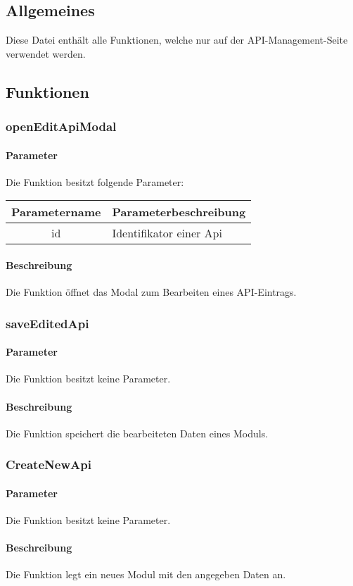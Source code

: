 \subsection{Allgemeines} Diese Datei enthält alle Funktionen, welche nur auf der API-Management-Seite verwendet werden.
\subsection{Funktionen}
\subsubsection{openEditApiModal}
\paragraph{Parameter} Die Funktion besitzt folgende Parameter:
\begin{table}[H]
	\begin{tabular}{|c|p{11cm}|}
		\hline
		\textbf{Parametername} & \textbf{Parameterbeschreibung} \\ \hline
		id & Identifikator einer Api \\ \hline
	\end{tabular}
\end{table}
\paragraph{Beschreibung} Die Funktion öffnet das Modal zum Bearbeiten eines API-Eintrags.
\subsubsection{saveEditedApi}
\paragraph{Parameter} Die Funktion besitzt keine Parameter.
\paragraph{Beschreibung} Die Funktion speichert die bearbeiteten Daten eines Moduls.
\subsubsection{CreateNewApi}
\paragraph{Parameter} Die Funktion besitzt keine Parameter.
\paragraph{Beschreibung} Die Funktion legt ein neues Modul mit den angegeben Daten an.